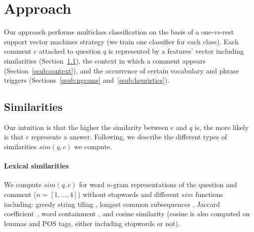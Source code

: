 \section{Approach}
\label{sec:approach}

Our approach performs multiclass classification on the basis of a one-vs-rest 
support vector machines strategy (\ie we train one classifier for each class). 
\blue{\ldots} 
Each comment $c$ attached to question $q$ is represented by a features' vector 
including similarities (Section~\ref{ssub:sim}), the context in which a comment 
appears (Section~\ref{ssub:context}), and the occurrence of certain vocabulary 
and phrase triggers (Sections~\ref{ssub:ngrams} and~\ref{ssub:heuristics}). 


% 

\subsection{Similarities}
\label{ssub:sim}

Our intuition is that the higher the similarity between $c$ and $q$ is, the 
more likely is that $c$ represents a \good answer. Following, we describe the 
different types of similarities $sim(q,c)$ we compute.

\paragraph{Lexical similarities}
We compute $sim(q, c)$ for word $n$-gram representations of the question and 
comment ($n=[1,\ldots,4]$) without stopwords and different $sim$ functions including: greedy 
string tiling \cite{Wise:1996}, longest common subsequences \cite{Allison:1986}, Jaccard 
coefficient~\cite{Jaccard:1901}, word containment \cite{Lyon:2001}, and cosine similarity 
(cosine is also computed on lemmas and POS tags, either including stopwords or 
not).

